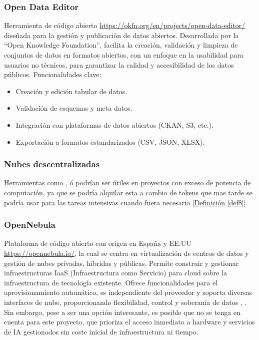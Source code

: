 \subsubsection*{Open Data Editor}
	Herramienta de código abierto \url{https://okfn.org/en/projects/open-data-editor/} diseñada para la gestión y publicación de datos abiertos. Desarrollada por la ``Open Knowledge Foundation'', facilita la creación, validación y limpieza de conjuntos de datos en formatos abiertos, con un enfoque en la usabilidad para usuarios no técnicos, para garantizar la calidad y accesibilidad de los datos públicos. Funcionalidades clave:
	\begin{itemize}
		\item Creación y edición tabular de datos.
		\item Validación de esquemas y meta datos.
		\item Integración con plataformas de datos abiertos (CKAN, S3, etc.).
		\item Exportación a formatos estandarizados (CSV, JSON, XLSX).
	\end{itemize}

\subsubsection*{Nubes descentralizadas}
Herramientas como \citep{GolemNetwork}, \citep{akashCloud} ó \citep{rendernetwork} podrían ser útiles en proyectos con exceso de potencia de computación, ya que se podría alquilar esta a cambio de tokens que mas tarde se podría usar para las tareas intensivas cuando fuera necesario \hyperref[def8]{[Definición \ref*{def8}]}.

\subsubsection*{OpenNebula}
Plataforma de código abierto con origen en España y EE.UU \url{https://opennebula.io/}, la cual se centra en virtualización de centros de datos y gestión de nubes privadas, híbridas y públicas. Permite construir y gestionar infraestructuras IaaS (Infraestructura como Servicio) para cloud sobre la infraestructura de tecnología existente. Ofrece funcionalidades para el aprovisionamiento automático, es independiente del proveedor y soporta diversas interfaces de nube, proporcionando flexibilidad, control y soberanía de datos \citep{OpenNebula2014Kumar}, \citep{PrivateIaaSComparative2016}. Sin embargo, pese a ser una opción interesante, es posible que no se tenga en cuenta para este proyecto, que prioriza el acceso inmediato a hardware y servicios de IA gestionados sin coste inicial de infraestructura ni tiempo. \\
 
